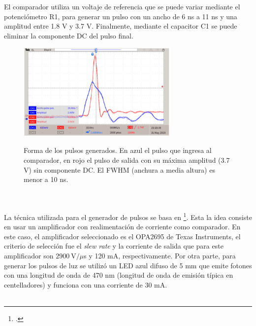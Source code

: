 El comparador utiliza un voltaje de referencia que se puede variar mediante el potenciómetro R1, para generar un pulso con un ancho de 6 ns a 11 ns y una amplitud entre 1.8 V y 3.7 V. Finalmente, mediante el capacitor C1 se puede eliminar la componente DC del pulso final.
\begin{figure}[h!]
\begin{centering}
    \caption{Forma de los pulsos generados. En azul el pulso que ingresa al comparador, en rojo el pulso de salida con su máxima amplitud (3.7 V) sin componente DC. El FWHM (anchura a media altura) es menor a 10 ns.}
   \includegraphics[width=0.7\textwidth]{Images/LED_Pulse_max.PNG}
    \label{fig:LED_Pulse_max}
  \par\end{centering}
\end{figure}
\\ \\
La técnica utilizada para el generador de pulsos se basa en \footcite{Pulses_CFA}. Esta la idea consiste en usar un amplificador con realimentación de corriente como comparador. En este caso, el amplificador seleccionado es el OPA2695 de Texas Instruments, el criterio de selección fue el \textit{slew rate} y la corriente de salida que para este amplificador son $2900~\mbox{V}/\mu$s y 120 mA, respectivamente. Por otra parte, para generar los pulsos de luz se utilizó un LED azul difuso de 5 mm que emite fotones con una longitud de onda de 470 nm (longitud de onda de emisión típica en centelladores) y funciona con una corriente  de 30 mA. \\ \\
